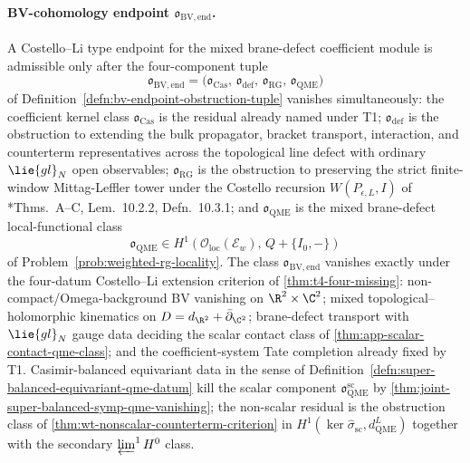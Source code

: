 \documentclass[11pt]{memoir}
\begin{document}
\paragraph{\texorpdfstring{BV-cohomology endpoint \(\mathfrak o_{\mathrm{BV,end}}\).}{BV-cohomology endpoint o-BV,end.}}
A Costello--Li type endpoint for the mixed brane-defect coefficient
module is admissible only after the four-component tuple
\[
  \mathfrak o_{\mathrm{BV,end}}
    =
    \bigl(
      \mathfrak o_{\mathrm{Cas}},\,
      \mathfrak o_{\mathrm{def}},\,
      \mathfrak o_{\mathrm{RG}},\,
      \mathfrak o_{\mathrm{QME}}
    \bigr)
\]
of Definition~\ref{defn:bv-endpoint-obstruction-tuple} vanishes
simultaneously: the coefficient kernel class
\(\mathfrak o_{\mathrm{Cas}}\) is the residual already named under T1;
\(\mathfrak o_{\mathrm{def}}\) is the obstruction to extending the bulk
propagator, bracket transport, interaction, and counterterm
representatives across the topological line defect with ordinary
\(\lie{gl}_N\) open observables; \(\mathfrak o_{\mathrm{RG}}\) is the
obstruction to preserving the strict finite-window Mittag-Leffler tower
under the Costello recursion \(W(P_{\epsilon,L},I)\) of
\cite{costello-renormalization}*{Thms.~A--C, Lem.~10.2.2,
Defn.~10.3.1}; and \(\mathfrak o_{\mathrm{QME}}\) is
the mixed brane-defect local-functional class
\[
  \mathfrak o_{\mathrm{QME}}
    \in
    H^1\!\left(
      \mathcal O_{\mathrm{loc}}(\mathcal E_w),\,
      Q+\{I_0,-\}
    \right)
\]
of Problem~\ref{prob:weighted-rg-locality}.  The class
\(\mathfrak o_{\mathrm{BV,end}}\) vanishes exactly under the four-datum
Costello--Li extension criterion of \ref{thm:t4-four-missing}:
non-compact/Omega-background BV vanishing on \(\R^2\times\C^2\); mixed
topological--holomorphic kinematics on
\(D=d_{\R^2}+\bar\partial_{\C^2}\); brane-defect transport with
\(\lie{gl}_N\) gauge data deciding the scalar contact class of
\ref{thm:app-scalar-contact-qme-class}; and the coefficient-system Tate
completion already fixed by T1.  Casimir-balanced equivariant data
in the sense of
Definition~\ref{defn:super-balanced-equivariant-qme-datum} kill the
scalar component \(\mathfrak o_{\mathrm{QME}}^{\mathrm{sc}}\) by
\ref{thm:joint-super-balanced-symp-qme-vanishing}; the non-scalar
residual is the obstruction class of
\ref{thm:wt-nonscalar-counterterm-criterion} in
\(H^1(\ker\widehat\sigma_{\mathrm{sc}},d_{\mathrm{QME}}^{L})\) together
with the secondary \(\varprojlim^1H^0\) class.
\end{document}

